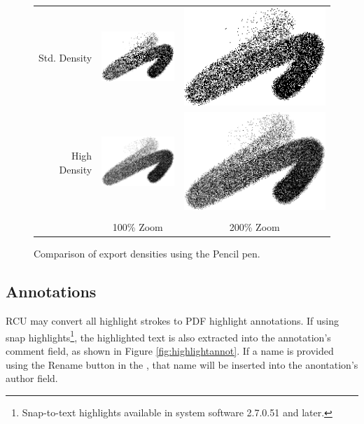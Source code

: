 \documentclass{memoir}
\begin{document}
{\begin{figure}[h]
\begin{tabular}{ r c c }
  Std. Density & \includegraphics[width=3cm]{images/export-density-standard.png}  & \includegraphics[width=6cm]{images/export-density-standard-2x.png}\\
  High Density & \includegraphics[width=3cm]{images/export-density-high-2x.png} & \includegraphics[width=6cm]{images/export-density-high-2x.png} \\
  \vspace{0.25cm} & \\
   & 100\% Zoom & 200\% Zoom \\
\end{tabular}
\caption{Comparison of export densities using the Pencil pen.}
\label{fig:exportdensity}
\end{figure}



\subsection{Annotations}
\label{sec:hltannot}
RCU may convert all highlight strokes to PDF highlight annotations. If using snap highlights\footnote{Snap-to-text highlights available in system software 2.7.0.51 and later.}, the highlighted text is also extracted into the annotation's comment field, as shown in Figure \ref{fig:highlightannot}. If a name is provided using the Rename button in the , that name will be inserted into the anontation's author field.


}
\end{document}
